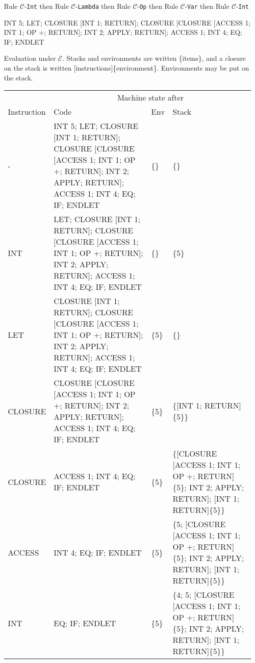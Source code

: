 \documentclass[11pt]{article}
\begin{document}
\begin{landscape}
{\smallskip
\noindent Rule $\mathcal{C}$-\texttt{Int} then Rule $\mathcal{C}$-\texttt{Lambda} then Rule $\mathcal{C}$-\texttt{Op} then Rule $\mathcal{C}$-\texttt{Var} then Rule $\mathcal{C}$-\texttt{Int}
\smallskip

\noindent INT 5; LET; CLOSURE [INT 1; RETURN]; CLOSURE [CLOSURE [ACCESS 1; INT 1; OP +; RETURN]; INT 2; APPLY; RETURN]; ACCESS 1; INT 4; EQ; IF; ENDLET


}

\newpage

\noindent Evaluation under $\mathcal{E}$. Stacks and environments are written \{items\}, and a closure on the stack is written [instructions]\{environment\}. Environments may be put on the stack.

\bigskip

{\small
\begin{tabular}{l||p{9.5cm}|l|p{9.5cm}}
& \multicolumn{3}{c}{Machine state after}                       \\
Instruction & Code      & Env   & Stack\\
   -        & INT 5; LET; CLOSURE [INT 1; RETURN]; CLOSURE [CLOSURE [ACCESS 1; INT 1; OP +; RETURN]; INT 2; APPLY; RETURN]; ACCESS 1; INT 4; EQ; IF; ENDLET & \{\}  & \{\}\\

INT & LET; CLOSURE [INT 1; RETURN]; CLOSURE [CLOSURE [ACCESS 1; INT 1; OP +; RETURN]; INT 2; APPLY; RETURN]; ACCESS 1; INT 4; EQ; IF; ENDLET& \{\}   & \{5\}\\

LET & CLOSURE [INT 1; RETURN]; CLOSURE [CLOSURE [ACCESS 1; INT 1; OP +; RETURN]; INT 2; APPLY; RETURN]; ACCESS 1; INT 4; EQ; IF; ENDLET & \{5\}   & \{\}\\

CLOSURE & CLOSURE [CLOSURE [ACCESS 1; INT 1; OP +; RETURN]; INT 2; APPLY; RETURN]; ACCESS 1; INT 4; EQ; IF; ENDLET & \{5\}   & \{[INT 1; RETURN]\{5\}\}\\

CLOSURE & ACCESS 1; INT 4; EQ; IF; ENDLET & \{5\} & \{[CLOSURE [ACCESS 1; INT 1; OP +; RETURN]\{5\}; INT 2; APPLY; RETURN]; [INT 1; RETURN]\{5\}\}\\

ACCESS & INT 4; EQ; IF; ENDLET & \{5\}   & \{5; [CLOSURE [ACCESS 1; INT 1; OP +; RETURN]\{5\}; INT 2; APPLY; RETURN]; [INT 1; RETURN]\{5\}\}\\

INT & EQ; IF; ENDLET & \{5\}   & \{4; 5; [CLOSURE [ACCESS 1; INT 1; OP +; RETURN]\{5\}; INT 2; APPLY; RETURN]; [INT 1; RETURN]\{5\}\}\\


\end{tabular}}
\end{landscape}
\end{document}
